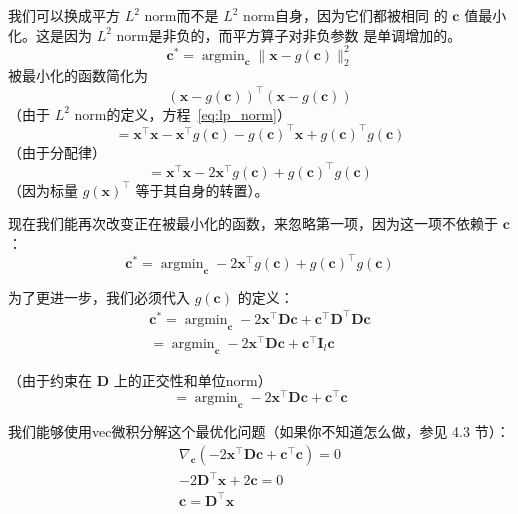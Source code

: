 我们可以换成平方 $L^2$ \gls*{norm}而不是 $L^2$ \gls*{norm}自身，因为它们都被相同
的 $\pmb{c}$ 值最小化。这是因为 $L^2$ \gls*{norm}是非负的，而平方算子对非负参数
是单调增加的。
\begin{equation}
  \pmb{c}^* = \mathop{\arg\min}_{\pmb{c}}\|\pmb{x} - g(\pmb{c})\|^2_2
\end{equation}
被最小化的函数简化为
\begin{equation}
  (\pmb{x} - g(\pmb{c}))^{\top}(\pmb{x} - g(\pmb{c}))
\end{equation}
（由于 $L^2$ \gls*{norm}的定义，方程~\ref{eq:lp_norm}）
\begin{equation}
  = \pmb{x}^{\top}\pmb{x} - \pmb{x}^{\top}g(\pmb{c}) - g(\pmb{c})^{\top}\pmb{x}
  + g(\pmb{c})^{\top}g(\pmb{c})
\end{equation}
（由于分配律）
\begin{equation}
  = \pmb{x}^{\top}\pmb{x} - 2\pmb{x}^{\top}g(\pmb{c}) +
  g(\pmb{c})^{\top}g(\pmb{c})
\end{equation}
（因为标量 $g(\pmb{x})^{\top}$ 等于其自身的转置）。

现在我们能再次改变正在被最小化的函数，来忽略第一项，因为这一项不依赖于 $\pmb{c}$：
\begin{equation}
  \pmb{c}^* = \mathop{\arg\min}_{\pmb{c}} - 2\pmb{x}^{\top}g(\pmb{c}) +
    g(\pmb{c})^{\top}g(\pmb{c})
\end{equation}

为了更进一步，我们必须代入 $g(\pmb{c})$ 的定义：
\begin{gather}
  \pmb{c}^* = \mathop{\arg\min}_{\pmb{c}}-2\pmb{x}^{\top}\pmb{D}\pmb{c} +
  \pmb{c}^{\top}\pmb{D}^{\top}\pmb{D}\pmb{c}\\
  = \mathop{\arg\min}_{\pmb{c}}-2\pmb{x}^{\top}\pmb{D}\pmb{c} +
  \pmb{c}^{\top}\pmb{I}_l\pmb{c}
\end{gather}

（由于约束在 $\pmb{D}$ 上的正交性和单位\gls*{norm}）
\begin{equation}
  = \mathop{\arg\min}_{\pmb{c}}-2\pmb{x}^{\top}\pmb{D}\pmb{c} +
  \pmb{c}^{\top}\pmb{c}
\end{equation}

我们能够使用\gls*{vec}微积分解这个最优化问题（如果你不知道怎么做，参见 4.3 节）：
\begin{gather}
  \nabla_{\pmb{c}}(-2\pmb{x}^{\top}\pmb{D}\pmb{c} + \pmb{c}^{\top}\pmb{c}) = 0\\
  -2\pmb{D}^{\top}\pmb{x} + 2\pmb{c} = 0\\
  \pmb{c} = \pmb{D}^{\top}\pmb{x}
\end{gather}

